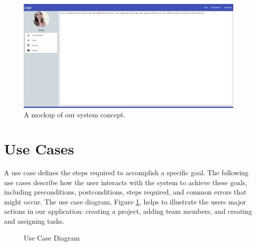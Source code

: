 \begin{figure}[ht]
\includegraphics[width=\textwidth]{mockup.png}
\caption{A mockup of our system concept.}
\end{figure}
\FloatBarrier

\section{Use Cases}
A use case defines the steps required to accomplish a specific goal. The following use cases describe how the user interacts with the system to achieve these goals, including preconditions, postconditions, steps required, and common errors that might occur. The use case diagram, Figure \ref{ucd}, helps to illustrate the user\textsc{}s major actions in our application: creating a project, adding team members, and creating and assigning tasks. 
\begin{figure}[ht]
\centering
{}
\caption{Use Case Diagram}
\label{ucd}
\end{figure}

\begin{figure}[ht]
\begin{usecase}







\end{usecase}
\end{figure}

